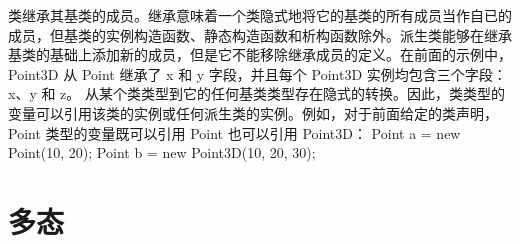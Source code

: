 类继承其基类的成员。继承意味着一个类隐式地将它的基类的所有成员当作自已的成员，但基类的实例构造函数、静态构造函数和析构函数除外。派生类能够在继承基类的基础上添加新的成员，但是它不能移除继承成员的定义。在前面的示例中，Point3D 从 Point 继承了 x 和 y 字段，并且每个 Point3D 实例均包含三个字段：x、y 和 z。
从某个类类型到它的任何基类类型存在隐式的转换。因此，类类型的变量可以引用该类的实例或任何派生类的实例。例如，对于前面给定的类声明，Point 类型的变量既可以引用 Point 也可以引用 Point3D：
Point a = new Point(10, 20);
Point b = new Point3D(10, 20, 30);


\chapter{多态}
